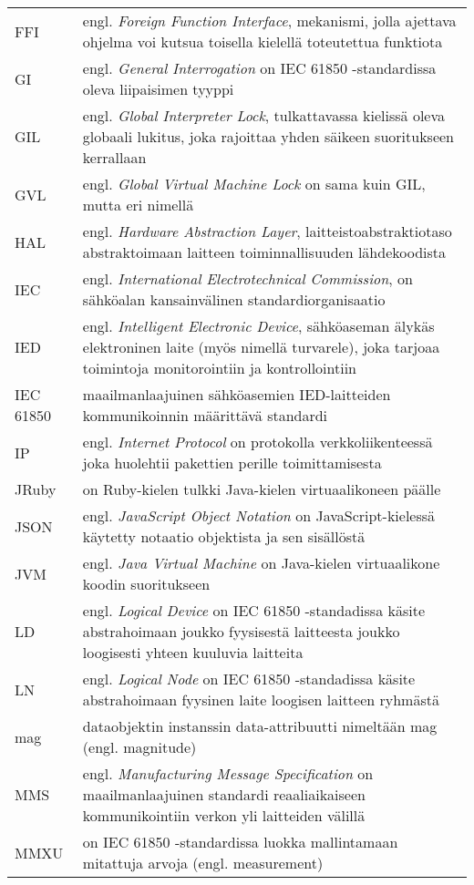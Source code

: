 \begin{tabularx}{\linewidth}[h]{@{} p{} p{} @{}}
	FFI & engl. \emph{Foreign Function Interface}, mekanismi, jolla ajettava ohjelma voi kutsua toisella kielellä toteutettua funktiota \\
	GI & engl. \emph{General Interrogation} on IEC 61850 -standardissa oleva liipaisimen tyyppi \\
	GIL & engl. \emph{Global Interpreter Lock}, tulkattavassa kielissä oleva globaali lukitus, joka rajoittaa yhden säikeen suoritukseen kerrallaan \\
	GVL & engl. \emph{Global Virtual Machine Lock} on sama kuin GIL, mutta eri nimellä \\
	HAL & engl. \emph{Hardware Abstraction Layer}, laitteistoabstraktiotaso abstraktoimaan laitteen toiminnallisuuden lähdekoodista \\
	IEC & engl. \emph{International Electrotechnical Commission}, on sähköalan kansainvälinen standardiorganisaatio \\
	IED & engl. \emph{Intelligent Electronic Device}, sähköaseman älykäs elektroninen laite (myös nimellä turvarele), joka tarjoaa toimintoja monitorointiin ja kontrollointiin \\
	IEC 61850 & maailmanlaajuinen sähköasemien IED-laitteiden kommunikoinnin määrittävä standardi \\
	IP & engl. \emph{Internet Protocol} on protokolla verkkoliikenteessä joka huolehtii pakettien perille toimittamisesta \\
	JRuby & on Ruby-kielen tulkki Java-kielen virtuaalikoneen päälle \\
	JSON & engl. \emph{JavaScript Object Notation} on JavaScript-kielessä käytetty notaatio objektista ja sen sisällöstä \\
	JVM & engl. \emph{Java Virtual Machine} on Java-kielen virtuaalikone koodin suoritukseen \\
	LD & engl. \emph{Logical Device} on IEC 61850 -standadissa käsite abstrahoimaan joukko fyysisestä laitteesta joukko loogisesti yhteen kuuluvia laitteita \\
	LN & engl. \emph{Logical Node} on IEC 61850 -standadissa käsite abstrahoimaan fyysinen laite loogisen laitteen ryhmästä \\
	mag & dataobjektin instanssin data-attribuutti nimeltään mag (engl. magnitude) \\
	MMS & engl. \emph{Manufacturing Message Specification} on maailmanlaajuinen standardi reaaliaikaiseen kommunikointiin verkon yli laitteiden välillä \\
	MMXU & on IEC 61850 -standardissa luokka mallintamaan mitattuja arvoja (engl. measurement) \\

\end{tabularx}
